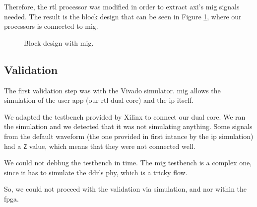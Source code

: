 Therefore, the \gls{rtl} processor was modified in order to extract \gls{axi}'s \gls{mig} signals needed. 
The result is the block design that can be seen in Figure \ref{fig:bd_mig}, where our processors is connected to \gls{mig}.

    \begin{figure}
        \centering
        \caption{Block design with \gls{mig}.}
        \label{fig:bd_mig}
    \end{figure}

\subsection{Validation}
The first validation step was with the Vivado simulator. 
\gls{mig} allows the simulation of the user app (our \gls{rtl} dual-core) and the \gls{ip} itself.

We adapted the testbench provided by Xilinx to connect our dual core. 
We ran the simulation and we detected that it was not simulating anything.
Some signals from the default waveform (the one provided in first intance by the \gls{ip} simulation) had a \texttt{Z} value, which means that they were not connected well.

We could not debbug the testbench in time.
The \gls{mig} testbench is a complex one, since it has to simulate the \gls{ddr}'s \gls{phy}, which is a tricky flow.

So, we could not proceed with the validation via simulation, and nor within the \gls{fpga}.

